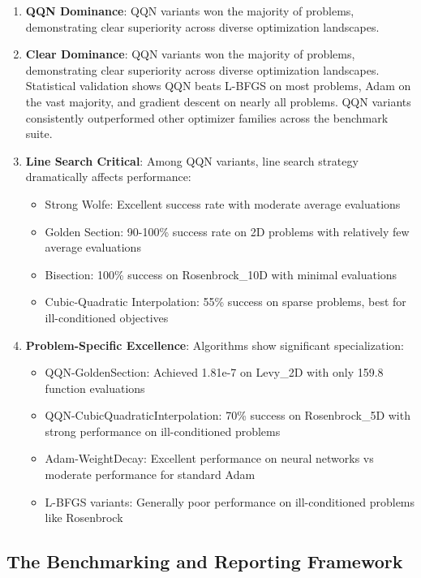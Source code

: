 \begin{enumerate}
\def\labelenumi{\arabic{enumi}.}
\item
  \textbf{QQN Dominance}: QQN variants won the majority of problems, demonstrating clear superiority across diverse optimization landscapes.
\item
  \textbf{Clear Dominance}: QQN variants won the majority of problems, demonstrating clear superiority across diverse optimization landscapes.
  Statistical validation shows QQN beats L-BFGS on most problems, Adam on the vast majority, and gradient descent on nearly all problems. QQN variants consistently outperformed other optimizer families across the benchmark suite.
\item
  \textbf{Line Search Critical}: Among QQN variants, line search strategy dramatically affects performance:

  \begin{itemize}
  \tightlist
  \item
    Strong Wolfe: Excellent success rate with moderate average evaluations
  \item
    Golden Section: 90-100\% success rate on 2D problems with relatively few average evaluations
  \item
    Bisection: 100\% success on Rosenbrock\_10D with minimal evaluations
  \item
    Cubic-Quadratic Interpolation: 55\% success on sparse problems, best for ill-conditioned objectives
  \end{itemize}
\item
  \textbf{Problem-Specific Excellence}: Algorithms show significant specialization:

  \begin{itemize}
  \tightlist
  \item
    QQN-GoldenSection: Achieved 1.81e-7 on Levy\_2D with only 159.8 function evaluations
  \item
    QQN-CubicQuadraticInterpolation: 70\% success on Rosenbrock\_5D with strong performance on ill-conditioned problems
  \item
    Adam-WeightDecay: Excellent performance on neural networks vs moderate performance for standard Adam
  \item
    L-BFGS variants: Generally poor performance on ill-conditioned problems like Rosenbrock
  \end{itemize}
\end{enumerate}

\hypertarget{the-benchmarking-and-reporting-framework}{%
\subsection{The Benchmarking and Reporting Framework}\label{the-benchmarking-and-reporting-framework}}

